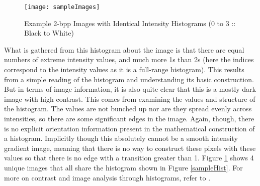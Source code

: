 \begin{figure}[h]
\centering
\texttt{[image: sampleImages]}
\caption{Example 2-bpp Images with Identical Intensity Histograms (0 to 3 :: Black to White)}
\label{sampleIm}
\end{figure}

What is gathered from this histogram about the image is that there are equal numbers of extreme intensity values, and much more 1s than 2s (here the indices correspond to the intensity values as it is a full-range histogram). This results from a simple reading of the histogram and understanding its basic construction. But in terms of image information, it is also quite clear that this is a mostly dark image with high contrast. This comes from examining the values and structure of the histogram. The values are not bunched up nor are they spread evenly across intensities, so there are some significant edges in the image. Again, though, there is no explicit orientation information present in the mathematical construction of a histogram. Implicitly though this absolutely cannot be a smooth intensity gradient image, meaning that there is no way to construct these pixels with these values so that there is no edge with a transition greater than 1. Figure \ref{sampleIm} shows 4 unique images that all share the histogram shown in Figure \ref{sampleHist}. For more on contrast and image analysis through histograms, refer to \cite{Gonzalez2008}.


